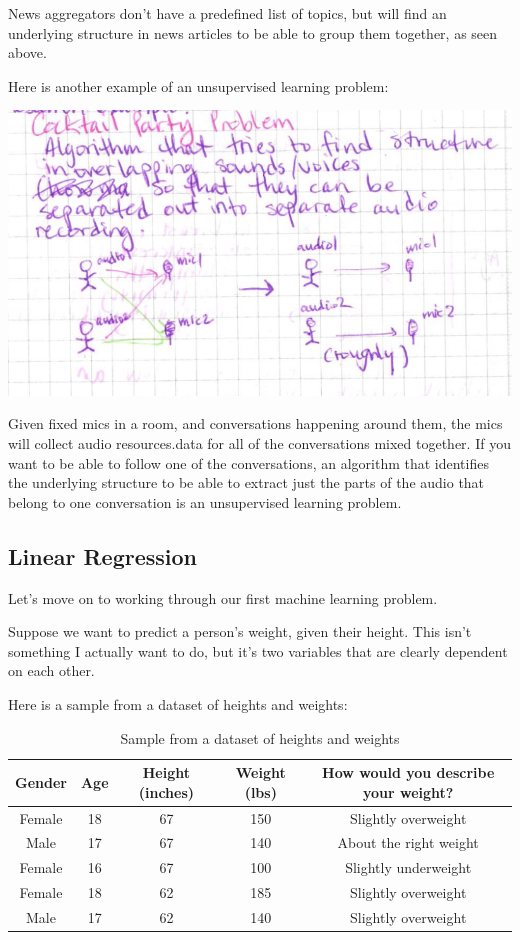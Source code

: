 \documentclass[12pt]{article}
\begin{document}
News aggregators don't have a predefined list of topics, but will find an underlying structure in news articles to be able to group them together, as seen above. 

Here is another example of an unsupervised learning problem:

\includegraphics[width={\textwidth}]{cocktail-party}

Given fixed mics in a room, and conversations happening around them, the mics will collect audio resources.data for all of the conversations mixed together. If you want to be able to follow one of the conversations, an algorithm that identifies the underlying structure to be able to extract just the parts of the audio that belong to one conversation is an unsupervised learning problem.

\subsection{Linear Regression}
Let's move on to working through our first machine learning problem.

Suppose we want to predict a person's weight, given their height. This isn't something I actually want to do, but it's two variables that are clearly dependent on each other.

Here is a sample from a dataset of heights and weights:
\begin{table}[htp]
\caption{Sample from a dataset of heights and weights}
\begin{center}
\begin{tabular}{|c|c|c|c|c|}
\hline
Gender & Age & Height (inches) & Weight (lbs) & How would you describe your weight? \\ \hline
Female & 18 & 67 & 150 & Slightly overweight \\
Male & 17 & 67 & 140 & About the right weight \\
Female & 16 & 67 & 100 & Slightly underweight \\
Female & 18 & 62 & 185 & Slightly overweight \\
Male & 17 & 62 & 140 & Slightly overweight \\
\hline
\end{tabular}
\end{center}
\label{Sample from a dataset of heights and weights}
\end{table}%
\end{document}
